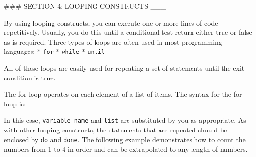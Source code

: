 \begin{Shaded}
\begin{Highlighting}[]
 
 
 
  \KeywordTok{|}\KeywordTok{)}   \KeywordTok{;;}
  \KeywordTok{|}\NormalTok{) }  \KeywordTok{;;}
  \KeywordTok{|}\NormalTok{) }  \KeywordTok{;;}
  \KeywordTok{|}\NormalTok{) }  \KeywordTok{;;}
  \KeywordTok{|}\NormalTok{) }  \KeywordTok{;;}
  \KeywordTok{*}\NormalTok{) }  \KeywordTok{;;}
 
\end{Highlighting}
\end{Shaded}

\#\#\# SECTION 4: LOOPING CONSTRUCTS \_\_\_

By using looping constructs, you can execute one or more lines of code
repetitively. Usually, you do this until a conditional test return
either true or false as is required. Three types of loops are often used
in most programming languages: * \texttt{for} * \texttt{while} *
\texttt{until}

All of these loops are easily used for repeating a set of statements
until the exit condition is true.

The for loop operates on each element of a list of items. The syntax for
the for loop is:

\begin{Shaded}
\begin{Highlighting}[]
  
\end{Highlighting}
\end{Shaded}

In this case, \texttt{variable-name} and \texttt{list} are substituted
by you as appropriate. As with other looping constructs, the statements
that are repeated should be enclosed by \texttt{do} and \texttt{done}.
The following example demonstrates how to count the numbers from 1 to 4
in order and can be extrapolated to any length of numbers.

